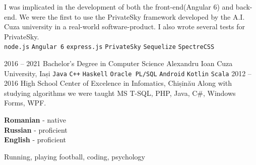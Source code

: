 \documentclass[9pt]{developercv} %
\begin{document}
\begin{entrylist}
{		I was implicated in the development of both the front-end(Angular 6) and back-end.
		 We were the first to use the PrivateSky framework developed by the A.I. Cuza university in
		 a real-world software-product. I also wrote several tests for PrivateSky.
		\\  \texttt{node.js}\slashsep
			\texttt{Angular 6}\slashsep
			\texttt{express.js}\slashsep
		    \texttt{PrivateSky}\slashsep
		    \texttt{Sequelize}\slashsep
		    \texttt{SpectreCSS}
		}
\end{entrylist}



\begin{entrylist}
	\entry
		{2016 -- 2021}
		{Bachelor's Degree in Computer Science}
		{Alexandru Ioan Cuza University, Iași}
		{\texttt{Java}\slashsep
		 \texttt{C++}\slashsep
		 \texttt{Haskell}\slashsep
		 \texttt{Oracle PL/SQL}\slashsep
		 \texttt{Android}\slashsep
		 \texttt{Kotlin}\slashsep
		 \texttt{Scala}
		}
	\entry
		{2012 -- 2016}
		{High School}
		{Center of Excelence in Infomatics, Chișinău}
		{Along with studying algorithms we were taught MS T-SQL, PHP, Java, C\#, Windows Forms, WPF.}
\end{entrylist}


\begin{minipage}[t]{0.3\textwidth}
	\vspace{-\baselineskip} %

	
	\textbf{Romanian} - native\\
	\textbf{Russian} - proficient\\
	\textbf{English} - proficient
\end{minipage}
\hfill
\begin{minipage}[t]{0.3\textwidth}
	\vspace{-\baselineskip} %
	
	
	Running, playing football, coding, psychology
\end{minipage}

\end{document}
